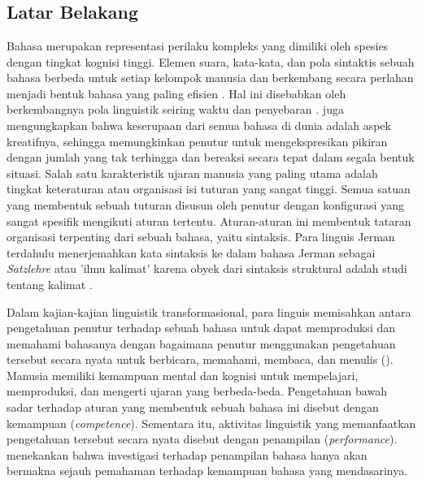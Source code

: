 

\chapter{\babSatu}



\section{Latar Belakang}

Bahasa merupakan representasi perilaku kompleks yang dimiliki oleh spesies dengan tingkat kognisi tinggi. Elemen suara, kata-kata, dan pola sintaktis sebuah bahasa berbeda untuk setiap kelompok manusia dan berkembang secara perlahan menjadi bentuk bahasa yang paling efisien \citep{aitchison2004change}. Hal ini disebabkan oleh berkembangnya pola linguistik seiring waktu dan penyebaran \citep{sapir1921intro}. \cite{chomsky1965syntactic} juga mengungkapkan bahwa keserupaan dari semua bahasa di dunia adalah aspek kreatifnya, sehingga memungkinkan penutur untuk mengekspresikan pikiran dengan jumlah yang tak terhingga dan bereaksi secara tepat dalam segala bentuk situasi. Salah satu karakteristik ujaran manusia yang paling utama adalah tingkat keteraturan atau organisasi isi tuturan yang sangat tinggi. Semua satuan yang membentuk sebuah tuturan disusun oleh penutur dengan konfigurasi yang sangat spesifik mengikuti aturan tertentu. Aturan-aturan ini membentuk tataran organisasi terpenting dari sebuah bahasa, yaitu sintaksis. Para linguis Jerman terdahulu menerjemahkan kata sintaksis ke dalam bahasa Jerman sebagai \textit{Satzlehre} atau 'ilmu kalimat' karena obyek dari sintaksis struktural adalah studi tentang kalimat \citep{tesniere1959elements}.

Dalam kajian-kajian linguistik transformasional, para linguis memisahkan antara pengetahuan penutur terhadap sebuah bahasa untuk dapat memproduksi dan memahami bahasanya dengan bagaimana penutur menggunakan pengetahuan tersebut secara nyata untuk berbicara, memahami, membaca, dan menulis (\citealp{chomsky1965syntactic,delahuntygarvey2010soundsense}). Manusia memiliki kemampuan mental dan kognisi untuk mempelajari, memproduksi, dan mengerti ujaran yang berbeda-beda. Pengetahuan bawah sadar terhadap aturan yang membentuk sebuah bahasa ini disebut dengan kemampuan (\textit{competence}). Sementara itu, aktivitas linguistik yang memanfaatkan pengetahuan tersebut secara nyata disebut dengan penampilan (\textit{performance}). \cite{chomsky1965syntactic} menekankan bahwa investigasi terhadap penampilan bahasa hanya akan bermakna sejauh pemahaman terhadap kemampuan bahasa yang mendasarinya.

